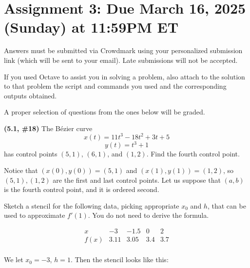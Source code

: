 \documentclass{eh-homework}
\begin{document}
\usetikzlibrary{arrows.meta}
\section*{Assignment 3: Due March 16, 2025 (Sunday) at 11:59PM ET}

Answers must be submitted via Crowdmark using your personalized submission link (which will be sent to your email). Late submissions will not be accepted.

If you used Octave to assist you in solving a problem, also attach to the solution to that problem the script and commands you used and the corresponding outputs obtained.

A proper selection of questions from the ones below will be graded.

\begin{question}{1}
\textbf{(5.1, \#18)} The Bézier curve
\[
x(t) = 11t^3 - 18t^2 + 3t + 5
\]
\[
y(t) = t^3 + 1
\]
has control points \((5,1)\), \((6,1)\), and \((1,2)\). Find the fourth control point.

\bigskip

Notice that \((x(0), y(0)) = (5,1)\) and \((x(1), y(1)) = (1,2)\), so \((5,1), (1,2)\) are the first and last control points. Let us suppose that \((a,b)\) is the fourth control point, and it is ordered second.
\end{question}

\begin{question}{2}
Sketch a stencil for the following data, picking appropriate \(x_0\) and \(h\), that can be used to approximate \(f'(1)\). You do not need to derive the formula.

\[
\begin{array}{c|cccc}
x & -3 & -1.5 & 0 & 2 \\
\hline
f(x) & 3.11 & 3.05 & 3.4 & 3.7 \\
\end{array}
\]

\bigskip

We let \(x_0 = -3\), \(h = 1\). Then the stencil looks like this:
\begin{center}
\end{center}
\end{question}
\end{document}
